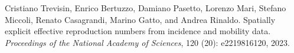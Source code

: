 \documentclass[10pt,letterpaper]{article}
\begin{document}
\begin{thebibliography}{27}
  Cristiano Trevisin, Enrico Bertuzzo, Damiano Pasetto, Lorenzo Mari, Stefano
    Miccoli, Renato Casagrandi, Marino Gatto, and Andrea Rinaldo.
  \newblock Spatially explicit effective reproduction numbers from incidence and
    mobility data.
  \newblock \emph{Proceedings of the National Academy of Sciences}, 120
    (20): e2219816120, 2023.
  
  \end{thebibliography}
  
  
%
\end{document}
